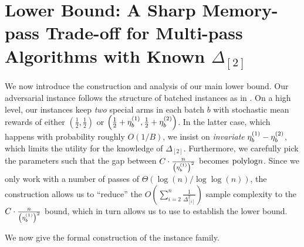 \section{Lower Bound: A Sharp Memory-pass Trade-off for Multi-pass Algorithms with Known $\Delta_{[2]}$}
\label{sec:lb-main}

We now introduce the construction and analysis of our main lower bound. 
Our adversarial instance follows the structure of batched instances as in . On a high level, our instances keep \emph{two} special arms in each batch $b$ with stochastic mean rewards of either $\left(\frac{1}{2}, \frac{1}{2}\right)$ or $\left(\frac{1}{2}+\eta^{(1)}_{b}, \frac{1}{2}+\eta^{(2)}_{b}\right)$. In the latter case, which happens with probability roughly $O(1/B)$, we insist on \emph{invariate} $\eta^{(1)}_{b}-\eta^{(2)}_{b}$, which limits the utility for the knowledge of $\Delta_{[2]}$. 
Furthermore, we carefully pick the parameters such that the gap between $C\cdot \frac{n}{\left(\eta^{(1)}_{b}\right)^2}$ becomes $\textnormal{polylog}{n}$. Since we only work with a number of passes of $\Theta(\log(n)/\log\log(n))$, the construction allows us to ``reduce'' the $O\left(\sum_{i=2}^{n}\frac{1}{\Delta^2_{[i]}}\right)$ %
sample complexity to the $C\cdot \frac{n}{\left(\eta^{(1)}_{b}\right)^2}$ bound, which in turn allows us to use  to establish the lower bound.

We now give the formal construction of the instance family.

